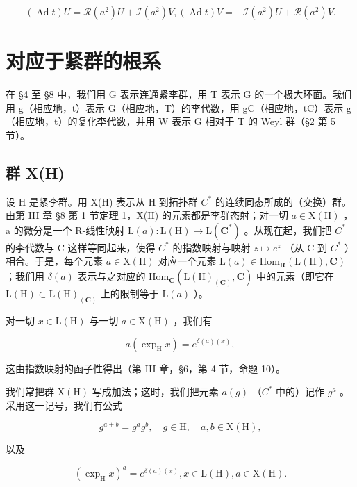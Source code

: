 \[
(\operatorname{Ad} t) U = \mathcal {R} (a ^ {2}) U + \mathcal {I} (a ^ {2}) V, (\operatorname{Ad} t) V = - \mathcal {I} (a ^ {2}) U + \mathcal {R} (a ^ {2}) V.\tag{20}
\]

\section{对应于紧群的根系}

在 §4 至 §8 中，我们用 G 表示连通紧李群，用 T 表示 G 的一个极大环面。我们用 g（相应地，t）表示 G（相应地，T）的李代数，用 gC（相应地，tC）表示 g（相应地，t）的复化李代数，并用 W 表示 G 相对于 T 的 Weyl 群（§2 第 5 节）。

\subsection{群 X(H)}

设 H 是紧李群。用 X(H) 表示从 H 到拓扑群 \(C^{*}\) 的连续同态所成的（交换）群。由第 III 章 §8 第 1 节定理 1，X(H) 的元素都是李群态射；对一切 \(a \in \mathrm{X}(\mathrm{H})\) ，a 的微分是一个 R-线性映射 \(\mathrm{L}(a) : \mathrm{L}(\mathrm{H}) \to \mathrm{L}(\mathbf{C}^{*})\) 。从现在起，我们把 \(C^{*}\) 的李代数与 C 这样等同起来，使得 \(C^{*}\) 的指数映射与映射 \(z \mapsto e^{z}\) （从 C 到 \(C^{*}\) ）相合。于是，每个元素 \(a \in \mathrm{X}(\mathrm{H})\) 对应一个元素 \(\mathrm{L}(a) \in \mathrm{Hom}_{\mathbf{R}}(\mathrm{L}(\mathrm{H}), \mathbf{C})\) ；我们用 \(\delta(a)\) 表示与之对应的 \(\mathrm{Hom}_{\mathbf{C}}(\mathrm{L}(\mathrm{H})_{(\mathbf{C})}, \mathbf{C})\) 中的元素（即它在 \(\mathrm{L}(\mathrm{H}) \subset \mathrm{L}(\mathrm{H})_{(\mathbf{C})}\) 上的限制等于 \(\mathrm{L}(a)\) ）。

对一切 \(x \in \mathrm{L}(\mathrm{H})\) 与一切 \(a \in \mathrm{X}(\mathrm{H})\) ，我们有

\[
a (\exp_ {\mathrm{H}} x) = e ^ {\delta (a) (x)},
\]

这由指数映射的函子性得出（第 III 章，§6，第 4 节，命题 10）。

我们常把群 \(\mathrm{X}(\mathrm{H})\) 写成加法；这时，我们把元素 \(a(g)\) （\(C^{*}\) 中的）记作 \(g^{a}\) 。采用这一记号，我们有公式

\[
g ^ {a + b} = g ^ {a} g ^ {b}, \quad g \in \mathrm{H}, \quad a, b \in \mathrm{X(H)},
\]

以及

\[
(\exp_ {\mathrm{H}} x) ^ {a} = e ^ {\delta (a) (x)}, x \in \mathrm{L} (\mathrm{H}), a \in \mathrm{X} (\mathrm{H}).
\]

